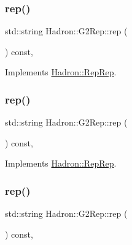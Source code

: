 \subsubsection{\texorpdfstring{rep()}{rep()}\hspace{0.1cm}{\footnotesize\ttfamily [1/5]}}
{\footnotesize\ttfamily std\+::string Hadron\+::\+G2\+Rep\+::rep (\begin{DoxyParamCaption}{ }\end{DoxyParamCaption}) const\hspace{0.3cm}{\ttfamily [inline]}, {\ttfamily [virtual]}}



Implements \mbox{\hyperlink{structHadron_1_1RepRep_ab3213025f6de249f7095892109575fde}{Hadron\+::\+Rep\+Rep}}.

\mbox{\label{structHadron_1_1G2Rep_aa186588eb9d24c8e3ecad3496a16225a}} 
\subsubsection{\texorpdfstring{rep()}{rep()}\hspace{0.1cm}{\footnotesize\ttfamily [2/5]}}
{\footnotesize\ttfamily std\+::string Hadron\+::\+G2\+Rep\+::rep (\begin{DoxyParamCaption}{ }\end{DoxyParamCaption}) const\hspace{0.3cm}{\ttfamily [inline]}, {\ttfamily [virtual]}}



Implements \mbox{\hyperlink{structHadron_1_1RepRep_ab3213025f6de249f7095892109575fde}{Hadron\+::\+Rep\+Rep}}.

\mbox{\label{structHadron_1_1G2Rep_aa186588eb9d24c8e3ecad3496a16225a}} 
\subsubsection{\texorpdfstring{rep()}{rep()}\hspace{0.1cm}{\footnotesize\ttfamily [3/5]}}
{\footnotesize\ttfamily std\+::string Hadron\+::\+G2\+Rep\+::rep (\begin{DoxyParamCaption}{ }\end{DoxyParamCaption}) const\hspace{0.3cm}{\ttfamily [inline]}, {\ttfamily [virtual]}}



